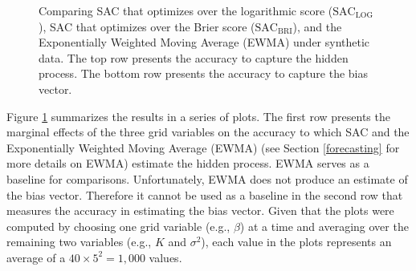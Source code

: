 \documentclass[aoas, preprint]{imsart}
\numberwithin{equation}{section}
\theoremstyle{plain}
\begin{document}
\begin{figure}[h!]


\caption[Optional caption for list of figures]{Comparing SAC that optimizes over the logarithmic score ($\text{SAC}_{\text{LOG}}$), SAC that optimizes over the Brier score ($\text{SAC}_{\text{BRI}}$), and the Exponentially Weighted Moving Average (EWMA) under synthetic data. The top row presents the accuracy to capture the hidden process. The bottom row presents the accuracy to capture the bias vector. }
\label{Synthetic}
\end{figure}

Figure \ref{Synthetic} summarizes the results in a series of plots. The first row presents the marginal effects of the three grid variables on the accuracy to which SAC and the Exponentially Weighted Moving Average (EWMA) (see Section \ref{forecasting} for more details on EWMA) estimate the hidden process. EWMA serves as a baseline for comparisons. Unfortunately, EWMA does not produce an estimate of the bias vector. Therefore it cannot be used as a baseline in the second row that measures the accuracy in estimating the bias vector.  Given that the plots were computed by choosing one grid variable (e.g., $\beta$) at a time and averaging over the remaining two variables  (e.g., $K$ and $\sigma^2$), each value in the plots represents an average of a $40 \times 5^2 = 1,000$ values. 
\end{document}
